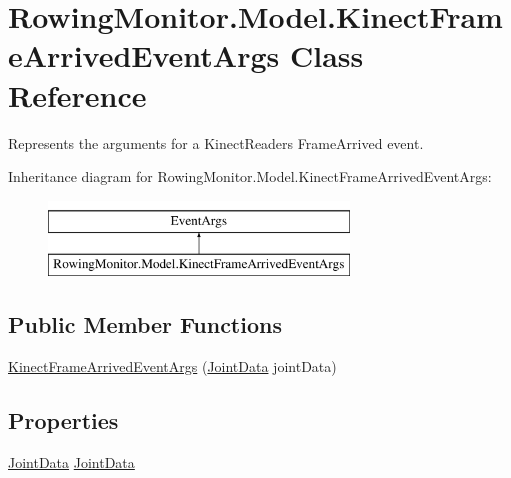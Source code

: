 \hypertarget{class_rowing_monitor_1_1_model_1_1_kinect_frame_arrived_event_args}{}\section{Rowing\+Monitor.\+Model.\+Kinect\+Frame\+Arrived\+Event\+Args Class Reference}
\label{class_rowing_monitor_1_1_model_1_1_kinect_frame_arrived_event_args}


Represents the arguments for a Kinect\+Reader\textquotesingle{}s Frame\+Arrived event.  


Inheritance diagram for Rowing\+Monitor.\+Model.\+Kinect\+Frame\+Arrived\+Event\+Args\+:\begin{figure}[H]
\begin{center}
\leavevmode
\includegraphics[height=2.000000cm]{class_rowing_monitor_1_1_model_1_1_kinect_frame_arrived_event_args}
\end{center}
\end{figure}
\subsection*{Public Member Functions}
\begin{DoxyCompactItemize}
\item 
\hyperlink{class_rowing_monitor_1_1_model_1_1_kinect_frame_arrived_event_args_a6c0155b21bc19c9fe163c5ea9ef66b21}{Kinect\+Frame\+Arrived\+Event\+Args} (\hyperlink{struct_rowing_monitor_1_1_model_1_1_util_1_1_joint_data}{Joint\+Data} joint\+Data)
\end{DoxyCompactItemize}
\subsection*{Properties}
\begin{DoxyCompactItemize}
\item 
\hyperlink{struct_rowing_monitor_1_1_model_1_1_util_1_1_joint_data}{Joint\+Data} \hyperlink{class_rowing_monitor_1_1_model_1_1_kinect_frame_arrived_event_args_a2249c19be25bb9b2c3627fb1bfa7512b}{Joint\+Data}
\end{DoxyCompactItemize}


